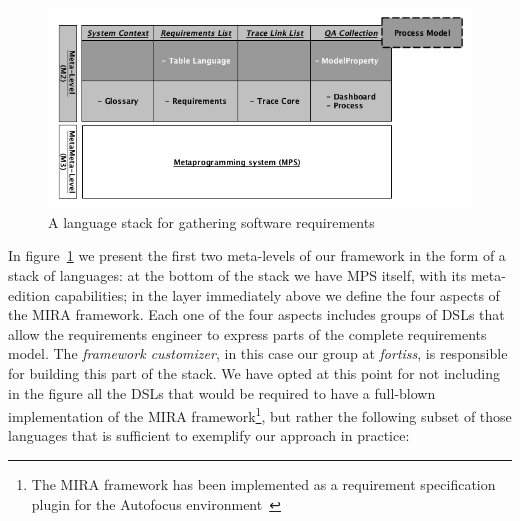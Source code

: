 \begin{figure}[!h]
\centering
\includegraphics[width=.75\textwidth]{./figures/Fig2.png}
\caption{A language stack for gathering software requirements
}
\label{fig:meta_struct_reqs}
\vspace{-.7cm}
\end{figure}
In figure~\ref{fig:meta_struct_reqs} we present the first two meta-levels of our
framework in the form of a stack of languages: at the bottom of the stack we
have MPS itself, with its meta-edition capabilities; in the layer immediately
above we define the four aspects of the MIRA framework. Each one of the four
aspects includes groups of DSLs that allow the requirements engineer to express
parts of the complete requirements model. The \emph{framework customizer}, in
this case our group at \emph{fortiss}, is responsible for building this part of
the stack. We have opted at this point for not including in the figure all the
DSLs that would be required to have a full-blown implementation of the MIRA
framework\footnote{The MIRA framework has been implemented as a requirement
specification plugin for the Autofocus environment~\cite{AF315}}, but rather the
following subset of those languages that is sufficient to exemplify our approach
in practice:
\vspace{-.2cm}
